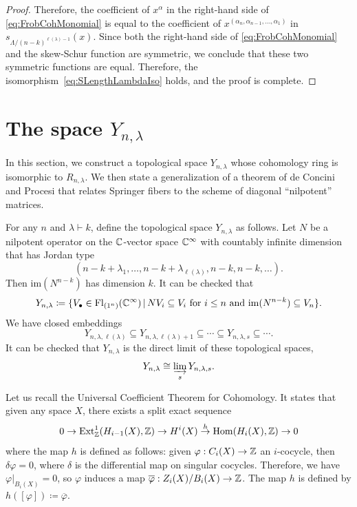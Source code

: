 \documentclass[12pt]{amsart}
\newcommand{\st}{\,|\,}
\newcommand{\Fl}{\mathrm{Fl}}
\newcommand{\la}{\lambda}
\newcommand{\im}{\mathrm{im}}
\newcommand{\Hom}{\mathrm{Hom}}
\begin{document}
\begin{proof}
Therefore, the coefficient of $x^\alpha$ in the right-hand side of \eqref{eq:FrobCohMonomial} is equal to the coefficient of $x^{(\alpha_n,\alpha_{n-1},\dots, \alpha_1)}$ in $s_{\Lambda/(n-k)^{\ell(\la)-1}}(x)$. Since both the right-hand side of \eqref{eq:FrobCohMonomial} and the skew-Schur function are symmetric, we conclude that these two symmetric functions are equal. Therefore, the isomorphism~\eqref{eq:SLengthLambdaIso} holds, and the proof is complete.
\end{proof}


\section{The space $Y_{n,\lambda}$}\label{sec:IndVariety}

In this section, we construct a topological space $Y_{n,\lambda}$ whose cohomology ring is isomorphic to $R_{n,\lambda}$. We then state a generalization of a theorem of de Concini and Procesi that relates Springer fibers to the scheme of diagonal ``nilpotent'' matrices.



For any $n$ and $\lambda\vdash k$, define the topological space $Y_{n,\la}$ as follows. Let $N$ be a nilpotent operator on the $\mathbb{C}$-vector space $\mathbb{C}^\infty$ with countably infinite dimension that has Jordan type \[(n-k+\la_1, \dots, n-k+\la_{\ell(\la)}, n-k,n-k,\dots).\] 
Then $\im(N^{n-k})$ has dimension $k$. It can be checked that 
\begin{align}
    Y_{n,\la}\coloneqq \{V_\bullet\in \Fl_{(1^n)}(\bC^\infty)\st NV_i\subseteq V_i \text{ for }i\leq n\text{ and }\im(N^{n-k})\subseteq V_n\}.
\end{align}
We have closed embeddings
\[
Y_{n,\la,\ell(\la)}\subseteq Y_{n,\la,\ell(\la)+1}\subseteq\cdots\subseteq Y_{n,\la,s}\subseteq\cdots.
\]
It can be checked that $Y_{n,\la}$ is the direct limit of these topological spaces,
\[Y_{n,\la} \cong \varinjlim_s Y_{n,\la,s}.\]

Let us recall the Universal Coefficient Theorem for Cohomology. It states that given any space $X$, there exists a split exact sequence
\[
0\to \mathrm{Ext}^1_\bZ(H_{i-1}(X),\bZ)\to H^i(X)\stackrel{h}{\to} \Hom(H_i(X),\bZ)\to 0
\]
where the map $h$ is defined as follows: given $\varphi: C_i(X)\to \mathbb{Z}$ an $i$-cocycle, then $\delta \varphi =0$, where $\delta$ is the differential map on singular cocycles. Therefore,  we have $\varphi|_{B_i(X)}=0$, so $\varphi$ induces a map $\overline \varphi :Z_i(X)/B_i(X)\to \mathbb{Z}$. The map $h$ is defined by $h([\varphi]) \coloneqq \overline\varphi$.
\end{document}
